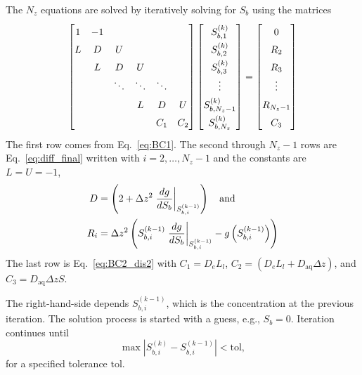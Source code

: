 \documentclass[letterpaper, twoside]{article}
\begin{document}
The $N_z$ equations are solved by iteratively solving for $S_b$ using the matrices
\begin{equation}
  \label{eq:system}
  \renewcommand*{\arraystretch}{1.5}
  \begin{bmatrix}
    1 &-1  &   &   &   & \\
    L &  D & U &  &   & \\
    ~ & L &  D & U &  & \\
    ~ & ~ & \ddots &  \ddots & \ddots & \\
    ~ & ~ & ~ & L &  D & U\\
    ~ & ~ & ~ & ~ &  C_1 & C_2  
  \end{bmatrix}
  \begin{bmatrix}
    S_{b,1}^{(k)}\\
    S_{b,2}^{(k)}\\
    S_{b,3}^{(k)}\\
   \vdots\\
    S_{b,N_z-1}^{(k)}\\
    S_{b,N_z}^{(k)}
  \end{bmatrix}
  =
    \begin{bmatrix}
   0\\
    R_{2}\\
    R_{3}\\
    \vdots\\
    R_{N_z-1}\\
    C_3
  \end{bmatrix}
\end{equation}
The first row comes from Eq.~\ref{eq:BC1}.
The second through $N_z-1$ rows are Eq.~\ref{eq:diff_final} written with $i=2,\dots,N_z-1$ and the constants are $L=U=-1$,
\begin{align*}
  D&=\left( 2 +\Delta z^2\left.\frac{d g}{d S_b}\right|_{S_{b,i}^{(k-1)}}\right)\text{\quad and}\\
  R_i&=\Delta z^2\left( S_{b,i}^{(k-1)} \left.\frac{d g}{d S_b}\right|_{S_{b,i}^{(k-1)}} - g\left(S_{b,i}^{(k-1)}\right)\right) 
\end{align*}
The last row is Eq.~\ref{eq:BC2_dis2} with $C_1=D_e L_l$, $C_2=\left(D_e L_l + D_{\mathrm{aq}} \Delta z\right)$, and $C_3=D_{\mathrm{aq}} \Delta z S$.

The right-hand-side depends $S_{b,i}^{(k-1)}$, which is the concentration at the previous iteration.  The solution process is started with a guess, e.g., $S_b=0$. Iteration continues until
\begin{equation*}
  \max\left| S_{b,i}^{(k)} - S_{b,i}^{(k-1)} \right| < \mathrm{tol},
\end{equation*}
for a specified tolerance $\mathrm{tol}$.
\end{document}
